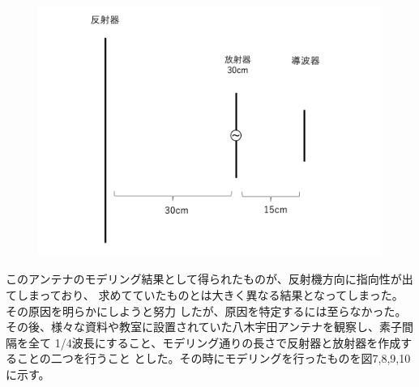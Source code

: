 \documentclass[dvipdfmx,autodetect-engine,titlepage]{jsarticle}
\begin{document}
\begin{figure}[h]
  \centering
  \includegraphics[scale=0.5]{pic5.png}
  \caption{}
\end{figure}

このアンテナのモデリング結果として得られたものが、反射機方向に指向性が出てしまっており、
求めてていたものとは大きく異なる結果となってしまった。その原因を明らかにしようと努力
したが、原因を特定するには至らなかった。\\
その後、様々な資料や教室に設置されていた八木宇田アンテナを観察し、素子間隔を全て
1/4波長にすること、モデリング通りの長さで反射器と放射器を作成することの二つを行うこと
とした。その時にモデリングを行ったものを図7,8,9,10に示す。
\end{document}
